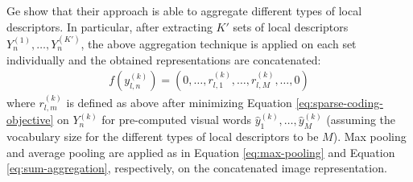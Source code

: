 Ge \etal show that their approach is able to aggregate different types of local descriptors. In particular, after extracting $K'$ sets of local descriptors $Y^{(1)}_n, \ldots, Y^{(K')}_n$, the above aggregation technique is applied on each set individually and the obtained representations are concatenated:
\begin{align}
    f(y_{l,n}^{(k)}) = \left(0,\ldots,r_{l,1}^{(k)},\ldots,r_{l,M}^{(k)},\ldots,0\right)
\end{align}
where $r_{l,m}^{(k)}$ is defined as above after minimizing Equation \eqref{eq:sparse-coding-objective} on $Y_n^{(k)}$ for pre-computed visual words $\hat{y}_1^{(k)},\ldots,\hat{y}_M^{(k)}$ (assuming the vocabulary size for the different types of local descriptors to be $M$). Max pooling and average pooling are applied as in Equation \eqref{eq:max-pooling} and Equation \eqref{eq:sum-aggregation}, respectively, on the concatenated image representation.

